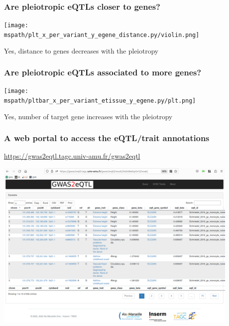 \documentclass{beamer}
\newcommand*{\mspath}{../../out/gwas417/pval_5e-08/r2_0.1/kb_1000/window_1000000/75_50}%
\begin{document}
    \begin{frame}
        \frametitle{Are pleiotropic eQTLs closer to genes?}

        \begin{center}
            \texttt{[image: \\mspath/plt\_x\_per\_variant\_y\_egene\_distance.py/violin.png]}
        \end{center}
        \vfill
        Yes, distance to genes decreases with the pleiotropy

    \end{frame}

    \begin{frame}
        \frametitle{Are pleiotropic eQTLs associated to more genes?}

        \begin{center}
            \texttt{[image: \\mspath/pltbar\_x\_per\_variant\_etissue\_y\_egene.py/plt.png]}
        \end{center}
        \vfill
        Yes, number of target gene increases with the pleiotropy

    \end{frame}

    \begin{frame}
        \frametitle{A web portal to access the eQTL/trait annotations}

        \url{https://gwas2eqtl.tagc.univ-amu.fr/gwas2eqtl}

        \begin{center}
            \includegraphics[width=0.9\textwidth]{fig/gwas2eqtl.png}
        \end{center}

    \end{frame}
\end{document}
